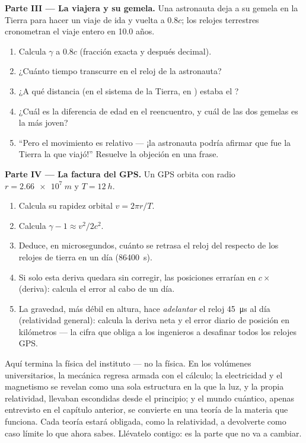 \begin{problem}
\medskip
\noindent\textbf{Parte III --- La viajera y su gemela.}
Una astronauta deja a su gemela en la Tierra para hacer un viaje de ida y vuelta a
$0.8c$; los relojes terrestres cronometran el viaje entero en 10.0 años.
\begin{enumerate}[resume]
  \item Calcula $\gamma$ a $0.8c$ (fracción exacta y después decimal).
  \item ¿Cuánto tiempo transcurre en el reloj de la astronauta?
  \item ¿A qué distancia (en el sistema de la Tierra, en ) estaba el ?
  \item ¿Cuál es la diferencia de edad en el reencuentro, y cuál de las dos gemelas es
        la más joven?
  \item ``Pero el movimiento es relativo --- ¡la astronauta podría afirmar que fue la
        Tierra la que viajó!'' Resuelve la objeción en una frase.
\end{enumerate}

\medskip
\noindent\textbf{Parte IV --- La factura del GPS.}
Un  GPS orbita con radio $r = \qty{2.66e7}{m}$ y  $T = \qty{12}{h}$.
\begin{enumerate}[resume]
  \item Calcula su rapidez orbital $v = 2\pi r/T$.
  \item Calcula $\gamma - 1 \approx v^2/2c^2$.
  \item Deduce, en microsegundos, cuánto se retrasa el reloj del  respecto de
        los relojes de tierra en un día (\qty{86400}{s}).
  \item Si solo esta deriva quedara sin corregir, las posiciones errarían en
        $c \times$ (deriva): calcula el error al cabo de un día.
  \item La gravedad, más débil en altura, hace \emph{adelantar} el reloj
        \qty{45}{\micro s} al día (relatividad general): calcula la deriva neta y el
        error diario de posición en kilómetros --- la cifra que obliga a los
        ingenieros a desafinar todos los relojes GPS.
\end{enumerate}
\end{problem}

\bigskip
\noindent
Aquí termina la física del instituto --- no la física. En los volúmenes
universitarios, la mecánica regresa armada con el cálculo; la electricidad y el
magnetismo se revelan como una sola estructura en la que la luz, y la propia
relatividad, llevaban escondidas desde el principio; y el mundo cuántico, apenas
entrevisto en el capítulo anterior, se convierte en una teoría de la materia que
funciona. Cada teoría estará obligada, como la relatividad, a devolverte como caso
límite lo que ahora sabes. Llévatelo contigo: es la parte que no va a cambiar.
